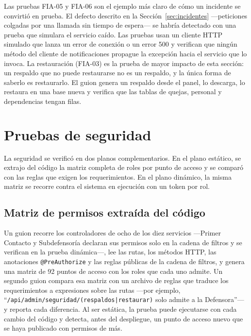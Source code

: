 	Las pruebas FIA-05 y FIA-06 son el ejemplo más claro de cómo un incidente se convirtió en prueba. El
	defecto descrito en la Sección~\ref{sec:incidentes} ---peticiones colgadas por una llamada sin tiempo
	de espera--- se habría detectado con una prueba que simulara el servicio caído. Las pruebas usan un
	cliente HTTP simulado que lanza un error de conexión o un error 500 y verifican que ningún método del
	cliente de notificaciones propague la excepción hacia el servicio que lo invoca. La restauración
	(FIA-03) es la prueba de mayor impacto de esta sección: un respaldo que no puede restaurarse no es un
	respaldo, y la única forma de saberlo es restaurarlo. El guion genera un respaldo desde el panel,
	lo descarga, lo restaura en una base nueva y verifica que las tablas de quejas, personal y
	dependencias tengan filas.

	\section{Pruebas de seguridad}
	\label{sec:pruebas_seguridad}
	La seguridad se verificó en dos planos complementarios. En el plano estático, se extrajo del código la
	matriz completa de roles por punto de acceso y se comparó con las reglas que exigen los
	requerimientos. En el plano dinámico, la misma matriz se recorre contra el sistema en ejecución con un
	token por rol.

	\subsection{Matriz de permisos extraída del código}
	Un guion recorre los controladores de ocho de los diez servicios ---Primer Contacto y Subdefensoría
	declaran sus permisos solo en la cadena de filtros y se verifican en la prueba dinámica---, lee las rutas, los
	métodos HTTP, las anotaciones \texttt{@PreAuthorize} y las reglas públicas de la cadena de filtros, y
	genera una matriz de 92 puntos de acceso con los roles que cada uno admite. Un segundo guion compara
	esa matriz con un archivo de reglas que traduce los requerimientos a expresiones sobre las rutas ---por
	ejemplo, ``\texttt{/api/admin/seguridad/(respaldos|restaurar)} solo admite a la Defensora''--- y
	reporta cada diferencia. Al ser estática, la prueba puede ejecutarse con cada cambio del código y detecta, antes del
	despliegue, un punto de acceso nuevo que se haya publicado con permisos de más.

